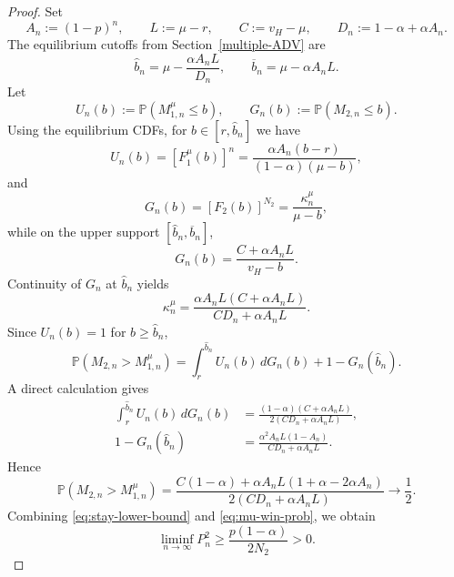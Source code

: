 \begin{proof}
\noindent Set
\begin{equation*}
    A_n := (1-p)^n, \qquad L := \mu-r, \qquad C := v_H-\mu, \qquad D_n := 1-\alpha+\alpha A_n.
\end{equation*}
The equilibrium cutoffs from Section~\ref{multiple-ADV} are
\begin{equation*}
    \hat{b}_n = \mu - \frac{\alpha A_n L}{D_n}, \qquad \overline{b}_n = \mu - \alpha A_n L.
\end{equation*}
Let
\begin{equation*}
    U_n(b) := \mathbb{P}(M_{1,n}^{\mu} \leq b), \qquad G_n(b) := \mathbb{P}(M_{2,n} \leq b).
\end{equation*}
Using the equilibrium CDFs, for $b \in [r,\hat{b}_n]$ we have
\begin{equation*}
    U_n(b) = \left[F_1^{\mu}(b)\right]^n = \frac{\alpha A_n (b-r)}{(1-\alpha)(\mu-b)},
\end{equation*}
and
\begin{equation*}
    G_n(b) = \left[F_2(b)\right]^{N_2} = \frac{\kappa_n^{\mu}}{\mu-b},
\end{equation*}
while on the upper support $[\hat{b}_n,\overline{b}_n]$,
\begin{equation*}
    G_n(b) = \frac{C+\alpha A_n L}{v_H-b}.
\end{equation*}
Continuity of $G_n$ at $\hat{b}_n$ yields
\begin{equation*}
    \kappa_n^{\mu} = \frac{\alpha A_n L(C+\alpha A_n L)}{C D_n + \alpha A_n L}.
\end{equation*}
Since $U_n(b)=1$ for $b \geq \hat{b}_n$,
\begin{equation*}
    \mathbb{P}(M_{2,n} > M_{1,n}^{\mu}) = \int_{r}^{\hat{b}_n} U_n(b)\, dG_n(b) + 1-G_n(\hat{b}_n).
\end{equation*}
A direct calculation gives
\begin{align*}
    \int_{r}^{\hat{b}_n} U_n(b)\, dG_n(b) &= \frac{(1-\alpha)(C+\alpha A_n L)}{2(C D_n + \alpha A_n L)}, \\[5pt]
    1-G_n(\hat{b}_n) &= \frac{\alpha^2 A_n L(1-A_n)}{C D_n + \alpha A_n L}.
\end{align*}
Hence
\begin{equation}\label{eq:mu-win-prob}
    \mathbb{P}(M_{2,n} > M_{1,n}^{\mu}) = \frac{C(1-\alpha)+\alpha A_nL(1+\alpha-2\alpha A_n)}{2(C D_n + \alpha A_n L)} \longrightarrow \frac{1}{2}.
\end{equation}
Combining \eqref{eq:stay-lower-bound} and \eqref{eq:mu-win-prob}, we obtain
\begin{equation*}
    \liminf_{n\to\infty} P_n^{2} \geq \frac{p(1-\alpha)}{2N_2} > 0.
\end{equation*}


\end{proof}
